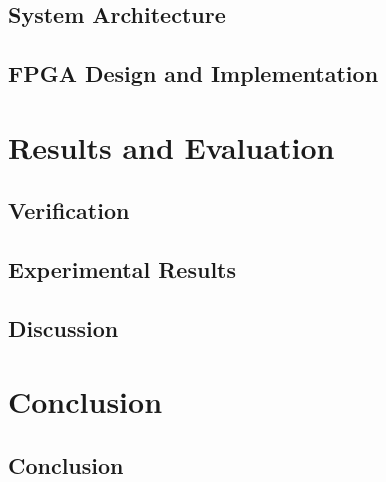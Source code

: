 \documentclass[UKenglish]{uiomasterthesis}  %
\begin{document}
\chapter{System Architecture}


\chapter{FPGA Design and Implementation}


\part{Results and Evaluation}
\chapter{Verification}


\chapter{Experimental Results}


\chapter{Discussion}


\part{Conclusion}
\chapter{Conclusion}


\backmatter{}
\printbibliography{}
\end{document}
